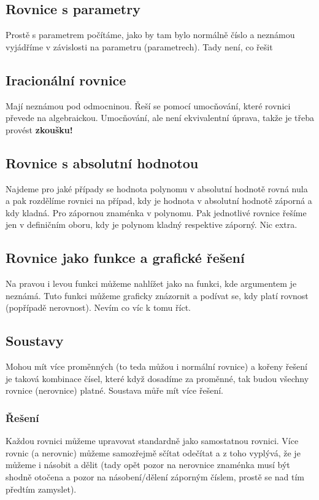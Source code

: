 \documentclass[12pt]{article}
\begin{document}
\subsection{Rovnice s parametry}
Prostě s parametrem počítáme, jako by tam bylo normálně číslo a neznámou vyjádříme v závislosti na parametru (parametrech). Tady není, co řešit
\subsection{Iracionální rovnice}
Mají neznámou pod odmocninou. Řeší se pomocí umocňování, které rovnici převede na algebraickou. Umocňování, ale není ekvivalentní úprava, takže je třeba provést \textbf{zkoušku!}
\subsection{Rovnice s absolutní hodnotou}
Najdeme pro jaké případy se hodnota polynomu v absolutní hodnotě rovná nula a pak rozdělíme rovnici na případ, kdy je hodnota v absolutní hodnotě záporná a kdy kladná. Pro zápornou  znaménka v polynomu. Pak jednotlivé rovnice řešíme jen v definičním oboru, kdy je polynom kladný respektive záporný. Nic extra.
\subsection{Rovnice jako funkce a grafické řešení}
Na pravou i levou funkci můžeme nahlížet jako na funkci, kde argumentem je neznámá. Tuto funkci můžeme graficky znázornit a podívat se, kdy platí rovnost (popřípadě nerovnost). Nevím co víc k tomu říct.
\subsection{Soustavy}
Mohou mít více proměnných (to teda můžou i normální rovnice) a kořeny řešení je taková kombinace čísel, které když dosadíme za proměnné, tak budou všechny rovnice (nerovnice) platné. Soustava můře mít více řešení.
\subsubsection{Řešení}
Každou rovnici můžeme upravovat standardně jako samostatnou rovnici. Více rovnic (a nerovnic) můžeme samozřejmě sčítat odečítat a z toho vyplývá, že je můžeme i násobit a dělit (tady opět pozor na nerovnice znaménka musí být shodně otočena a pozor na násobení/dělení záporným číslem, prostě se nad tím předtím zamyslet).
\end{document}
